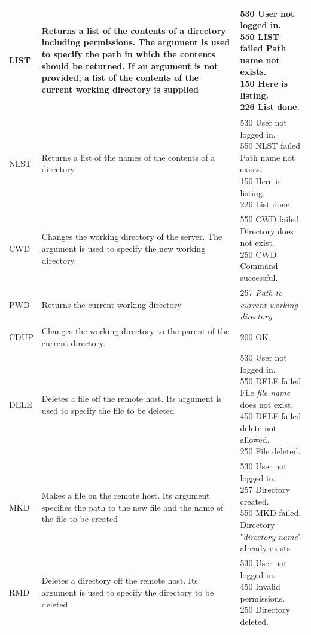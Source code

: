 \documentclass[10pt,twocolumn]{witseiepaper}
\begin{document}
\begin{appendix}
\begin{longtable}{|p{2cm}|p{7cm}|p{7cm}|}
	\hline 
LIST & Returns a list of the contents of a directory including permissions. The argument is used to specify the path in which the contents should be returned. If an argument is not provided, a list of the contents of the current working directory is supplied &\makecell[l]{530 User not logged in. \\550 LIST failed Path name not exists. \\150 Here is listing. \\226 List done.}\\ 
	\hline 
NLST & Returns a list of the names of the contents of a directory & \makecell[l]{530 User not logged in. \\550 NLST failed Path name not exists. \\150 Here is listing. \\226 List done.} \\ 
	\hline 
CWD	& Changes the working directory of the server. The argument is used to specify the new working directory.  & \makecell[l]{550 CWD failed. Directory does not exist. \\250 CWD Command successful.} \\ 
	\hline 
PWD	& Returns the current working directory & 257 \textit{Path to current working directory} \\ 
	\hline 
CDUP	& Changes the working directory to the parent of the current directory. & 200 OK. \\ 
	\hline 
DELE	& Deletes a file off the remote host. Its argument is used to specify the file to be deleted & \makecell[l]{530 User not logged in. \\550 DELE failed File \textit{file name} does not exist. \\450 DELE failed delete not allowed. \\250 File deleted.} \\ 
	\hline 
MKD	& Makes a file on the remote host. Its argument specifies the path to the new file and the name of the file to be created & \makecell[l]{530 User not logged in. \\257 Directory created. \\550 MKD failed. Directory "\textit{directory name}" \\already exists.}\\ 
	\hline 
RMD	& Deletes a directory off the remote host. Its argument is used to specify the directory to be deleted & \makecell[l]{530 User not logged in. \\450 Invalid permissions. \\250 Directory deleted.}\\ 

\end{longtable}
\end{appendix}
\end{document}
